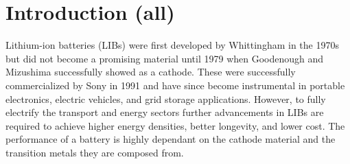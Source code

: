 \documentclass[journal=jacsat,manuscript=article]{achemso}
\begin{document}
\section{Introduction (all)}

Lithium-ion batteries (LIBs) were first developed by Whittingham in the 1970s \cite{whittingham1974hydrated,whittingham1976electrical} but did not become a promising material until 1979 when Goodenough and Mizushima successfully showed  as a cathode.\cite{mizushima1980lixcoo2} These were successfully commercialized by Sony in 1991 and have since become instrumental in portable electronics, electric vehicles, and grid storage applications.\cite{armand2008building,scrosati2011lithium,goodenough2013li,etacheri2011challenges,he2012layered,rozier2015li,dunn2011electrical} However, to fully electrify the transport and energy sectors further advancements in LIBs are required to achieve higher energy densities, better longevity, and lower cost. The performance of a battery is highly dependant on the cathode material and the transition metals they are composed from.\cite{Sari2019,Julien2014,whittingham2008materials,bruce2012li}
\end{document}
